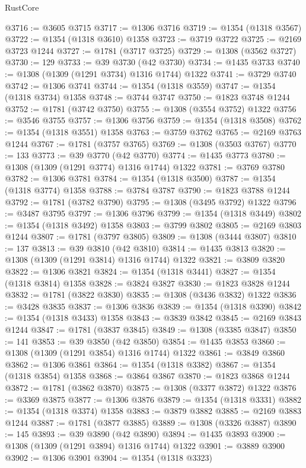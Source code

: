 \begin{lexlean}{RustCore}
\begin{coremodule}
@3716 := @3605 @3715
@3717 := @1306 @3716
@3719 := @1354 (@1318 @3567)
@3722 := @1354 (@1318 @3610) @1358
@3723 := @3719 @3722
@3725 := @2169 @3723 @1244
@3727 := @1781 (@3717 @3725)
@3729 := @1308 (@3562 @3727)
@3730 := 129
@3733 := @39 @3730 (@42 @3730)
@3734 := @1435 @3733
@3740 := @1308 (@1309 (@1291 @3734) @1316 @1744) @1322
@3741 := @3729 @3740
@3742 := @1306 @3741
@3744 := @1354 (@1318 @3559)
@3747 := @1354 (@1318 @3734) @1358
@3748 := @3744 @3747
@3750 := @1823 @3748 @1244
@3752 := @1781 (@3742 @3750)
@3755 := @1308 (@3554 @3752) @1322
@3756 := @3546 @3755
@3757 := @1306 @3756
@3759 := @1354 (@1318 @3508)
@3762 := @1354 (@1318 @3551) @1358
@3763 := @3759 @3762
@3765 := @2169 @3763 @1244
@3767 := @1781 (@3757 @3765)
@3769 := @1308 (@3503 @3767)
@3770 := 133
@3773 := @39 @3770 (@42 @3770)
@3774 := @1435 @3773
@3780 := @1308 (@1309 (@1291 @3774) @1316 @1744) @1322
@3781 := @3769 @3780
@3782 := @1306 @3781
@3784 := @1354 (@1318 @3500)
@3787 := @1354 (@1318 @3774) @1358
@3788 := @3784 @3787
@3790 := @1823 @3788 @1244
@3792 := @1781 (@3782 @3790)
@3795 := @1308 (@3495 @3792) @1322
@3796 := @3487 @3795
@3797 := @1306 @3796
@3799 := @1354 (@1318 @3449)
@3802 := @1354 (@1318 @3492) @1358
@3803 := @3799 @3802
@3805 := @2169 @3803 @1244
@3807 := @1781 (@3797 @3805)
@3809 := @1308 (@3444 @3807)
@3810 := 137
@3813 := @39 @3810 (@42 @3810)
@3814 := @1435 @3813
@3820 := @1308 (@1309 (@1291 @3814) @1316 @1744) @1322
@3821 := @3809 @3820
@3822 := @1306 @3821
@3824 := @1354 (@1318 @3441)
@3827 := @1354 (@1318 @3814) @1358
@3828 := @3824 @3827
@3830 := @1823 @3828 @1244
@3832 := @1781 (@3822 @3830)
@3835 := @1308 (@3436 @3832) @1322
@3836 := @3428 @3835
@3837 := @1306 @3836
@3839 := @1354 (@1318 @3390)
@3842 := @1354 (@1318 @3433) @1358
@3843 := @3839 @3842
@3845 := @2169 @3843 @1244
@3847 := @1781 (@3837 @3845)
@3849 := @1308 (@3385 @3847)
@3850 := 141
@3853 := @39 @3850 (@42 @3850)
@3854 := @1435 @3853
@3860 := @1308 (@1309 (@1291 @3854) @1316 @1744) @1322
@3861 := @3849 @3860
@3862 := @1306 @3861
@3864 := @1354 (@1318 @3382)
@3867 := @1354 (@1318 @3854) @1358
@3868 := @3864 @3867
@3870 := @1823 @3868 @1244
@3872 := @1781 (@3862 @3870)
@3875 := @1308 (@3377 @3872) @1322
@3876 := @3369 @3875
@3877 := @1306 @3876
@3879 := @1354 (@1318 @3331)
@3882 := @1354 (@1318 @3374) @1358
@3883 := @3879 @3882
@3885 := @2169 @3883 @1244
@3887 := @1781 (@3877 @3885)
@3889 := @1308 (@3326 @3887)
@3890 := 145
@3893 := @39 @3890 (@42 @3890)
@3894 := @1435 @3893
@3900 := @1308 (@1309 (@1291 @3894) @1316 @1744) @1322
@3901 := @3889 @3900
@3902 := @1306 @3901
@3904 := @1354 (@1318 @3323)

\end{coremodule}
\end{lexlean}
